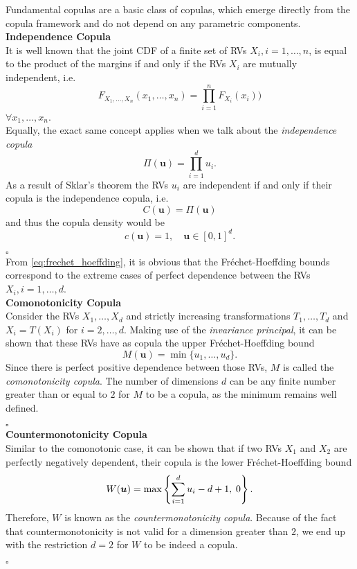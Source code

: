 
Fundamental copulas are a basic class of copulas, which emerge directly from the copula framework and do not depend on any parametric components. \\

\textbf{Independence Copula}\\
It is well known that the joint \ac{CDF} of a finite set of \acp{RV}
$X_i, i = 1, \ldots, n$, is equal to the product of the margins if and only if the \acp{RV} $X_i$ are mutually independent, i.e.
$$
F_{X_{1}, \ldots, X_{n}}\left(x_{1}, \ldots, x_{n}\right)= \prod_{i=1}^{n} F_{X_{i}}\left(x_{i}\right)) 
$$
$\forall x_1, \ldots, x_n$.\\
Equally, the exact same concept applies when we talk about the \textit{independence copula}
\begin{equation}
\Pi (\bm{u}) = \prod \limits _{i = 1}^d u_i.
\end{equation}
As a result of Sklar's theorem the \ac{RV}s $u_i$ are independent if and only if their copula is the independence copula, i.e.
$$ C(\bm{u}) = \Pi (\bm{u}) $$
and thus the copula density would be 
$$c(\boldsymbol{u})=1, \quad \boldsymbol{u} \in[0,1]^{d}.$$

\hfill $\square$ \\


From \autoref{eq:frechet_hoeffding}, it is obvious that the Fr\'echet-Hoeffding bounds correspond to the extreme cases of perfect dependence between the \ac{RV}s $X_i, i = 1, \ldots, d$. \\

\textbf{Comonotonicity Copula}\\
Consider the \ac{RV}s $X_1, \ldots, X_d$ and strictly increasing transformations $T_1, \ldots, T_d$ and $X_i = T(X_i)$ for $i = 2, \ldots, d$. Making use of the \textit{invariance principal}, it can be shown that these \ac{RV}s have as copula the upper Fr\'echet-Hoeffding bound 
$$M(\bm{u}) = \min\{ u_1, \ldots, u_d \}.$$ Since there is perfect positive dependence between those \ac{RV}s, $M$ is called the \textit{comonotonicity copula}. The number of dimensions $d$ can be any finite number greater than or equal to $2$ for $M$ to be a copula, as the minimum remains well defined.

\hfill $\square$ \\



\textbf{Countermonotonicity Copula}\\
Similar to the comonotonic case, it can be shown that if two \acp{RV} $X_1$ and $X_2$ are perfectly negatively dependent, their copula is the lower Fr\'echet-Hoeffding bound
$$
W(\boldsymbol{u})=\max \left\{\sum\limits_{i=1}^{d} u_{i}-d+1, \hspace{0.25em} 0\right\}.
$$
Therefore, $W$ is known as the \textit{countermonotonicity copula}. Because of the fact that countermonotonicity is not valid for a dimension greater than $2$, we end up with the restriction $d=2$ for $W$ to be indeed a copula.

\hfill $\square$ \\








